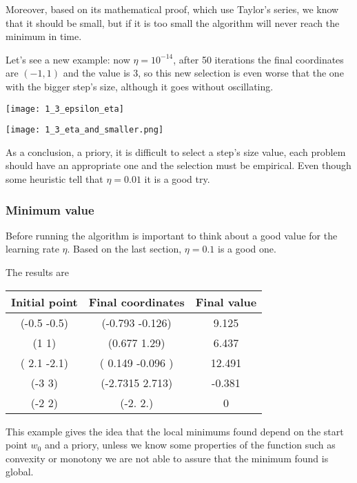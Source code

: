     Moreover, based on its mathematical proof, which use Taylor's series, we know that it should be small, but if it is too small the algorithm will never reach the minimum in time.

 Let's see a new example: now $\eta = 10^{-14}$, after 50 iterations  the final coordinates are $(-1, 1)$  and the value is $3$, so this new selection is even worse that the one with the bigger step's size, although it goes without oscillating.  

 \texttt{[image: 1\_3\_epsilon\_eta]}
 
 \texttt{[image: 1\_3\_eta\_and\_smaller.png]}
 
  As a conclusion, a priory, it is difficult to select a step's size value, each problem should have an appropriate one and the selection must be empirical. Even though some heuristic \cite{LFD} tell that $\eta = 0.01$ it is a good try.  

 
  

\subsubsection{Minimum value }


Before running the algorithm is important to think about a good value for the learning rate $\eta$. Based on the last section, $\eta = 0.1$ is a good one. 


The results are

\begin{center}
  \begin{tabular}{ |c|c|c| }
    \hline
    Initial point  & Final coordinates & Final value  \\ 
    \hline

    (-0.5 -0.5) &  (-0.793 -0.126) &   9.125 \\
(1 1) &  (0.677 1.29) &   6.437 \\
( 2.1 -2.1) &  ( 0.149 -0.096 ) &   12.491 \\
(-3  3) &  (-2.7315  2.713) &  -0.381 \\
(-2  2) &  (-2.  2.) &  0 \\
    
 
 \hline
\end{tabular}
\end{center}


This example gives the idea that the local minimums found depend on the start point $w_0$ and a priory, unless we know some properties
of the function such as convexity or monotony we are not able to assure that the minimum found is global.


